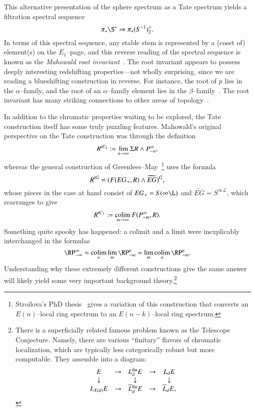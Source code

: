 This alternative presentation of the sphere spectrum as a Tate spectrum yields a filtration spectral sequence \[\pi_* \S^* \Rightarrow \pi_* (S^{-1})^\wedge_2.\]  In terms of this spectral sequence, any stable stem is represented by a (coset of) element(s) on the $E_1$--page, and this reverse reading of the spectral sequence is known as the \textit{Mahowald root invariant}~\cite{MahowaldShick}.  The root invariant appears to possess deeply interesting redshifting properties---not wholly surprising, since we are reading a blueshifting construction in reverse.  For instance, the root of $p$ lies in the $\alpha$--family, and the root of an $\alpha$--family element lies in the $\beta$--family~\cite{BehrensRootInv}.  The root invariant has many striking connections to other areas of topology~\cite{MahowaldRavenel}.

In addition to the chromatic properties waiting to be explored, the Tate construction itself has some truly puzzling features.  Mahowald's original perspective on the Tate construction was through the definition \[R^{tC_2} := \lim_{n \to \infty} \Sigma R \wedge P^\infty_{-n},\] whereas the general construction of Greenlees--May~\cite{GreenleesMay}\footnote{Stroilova's PhD thesis~\cite{Stroilova} gives a variation of this construction that converts an $E(n)$--local ring spectrum to an $E(n-k)$--local ring spectrum.} uses the formula \[R^{tG} = (F(EG_+, R) \wedge \widetilde{EG})^G,\] whose pieces in the case at hand consist of $EG_+ = S(\infty \L)$ and $\widetilde{EG} = S^{\infty \mathcal L}$, which rearranges to give \[R^{tC_2} := \operatorname*{colim}_{m \to \infty} F(P^\infty_{-m}, R).\]  Something quite spooky has happened: a colimit and a limit were inexplicably interchanged in the formulas \[\RP^\infty_{-\infty} = \colim_n \lim_m \RP^n_{-m} = \lim_m \colim_n \RP^n_{-m}.\]  Understanding why these extremely different constructions give the same answer will likely yield some very important background theory.\footnote{There is a superficially related famous problem known as the Telescope Conjecture.  Namely, there are various ``finitary'' flavors of chromatic localization, which are typically less categorically robust but more computable.  They assemble into a diagram:
\[\begin{array}{ccccc}
E & \to & L_d^{\mathrm{fin}} E & \to & L_d E \\
\downarrow & & \downarrow & & \downarrow \\
L_{X(d)} E & \to & \widehat L_d^{\mathrm{fin}} E & \to & \widehat L_d E,
\end{array}\]
}
